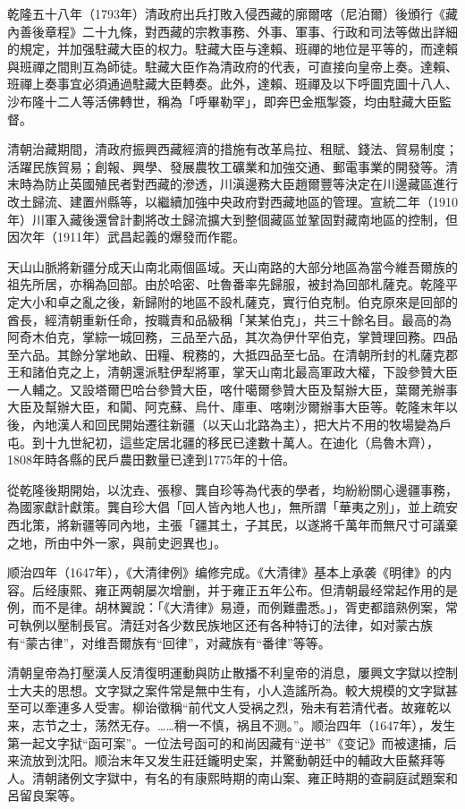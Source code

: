 乾隆五十八年（1793年）清政府出兵打敗入侵西藏的廓爾喀（尼泊爾）後頒行《藏內善後章程》二十九條，對西藏的宗教事務、外事、軍事、行政和司法等做出詳細的規定，并加强駐藏大臣的权力。駐藏大臣与達賴、班禪的地位是平等的，而達賴與班禪之間則互為師徒。駐藏大臣作為清政府的代表，可直接向皇帝上奏。達賴、班禪上奏事宜必須通過駐藏大臣轉奏。此外，達賴、班禪及以下呼圖克圖十八人、沙布隆十二人等活佛轉世，稱為「呼畢勒罕」，即奔巴金瓶掣簽，均由駐藏大臣監督。

清朝治藏期間，清政府振興西藏經濟的措施有改革烏拉、租賦、錢法、貿易制度；活躍民族貿易；創報、興學、發展農牧工礦業和加強交通、郵電事業的開發等。清末時為防止英國殖民者對西藏的滲透，川滇邊務大臣趙爾豐等決定在川邊藏區進行改土歸流、建置州縣等，以繼續加強中央政府對西藏地區的管理。宣統二年（1910年）川軍入藏後還曾計劃將改土歸流擴大到整個藏區並鞏固對藏南地區的控制，但因次年（1911年）武昌起義的爆發而作罷。

天山山脈將新疆分成天山南北兩個區域。天山南路的大部分地區為當今維吾爾族的祖先所居，亦稱為回部。由於哈密、吐魯番率先歸服，被封為回部札薩克。乾隆平定大小和卓之亂之後，新歸附的地區不設札薩克，實行伯克制。伯克原來是回部的酋長，經清朝重新任命，按職責和品級稱「某某伯克」，共三十餘名目。最高的為阿奇木伯克，掌綜一城回務，三品至六品，其次為伊什罕伯克，掌贊理回務。四品至六品。其餘分掌地畝、田糧、稅務的，大抵四品至七品。在清朝所封的札薩克郡王和諸伯克之上，清朝還派駐伊犁將軍，掌天山南北最高軍政大權，下設參贊大臣一人輔之。又設塔爾巴哈台參贊大臣，喀什噶爾參贊大臣及幫辦大臣，葉爾羌辦事大臣及幫辦大臣，和闐、阿克蘇、烏什、庫車、喀喇沙爾辦事大臣等。乾隆末年以後，內地漢人和回民開始遷往新疆（以天山北路為主），把大片不用的牧場變為戶屯。到十九世紀初，這些定居北疆的移民已達數十萬人。在迪化（烏魯木齊），1808年時各縣的民戶農田數量已達到1775年的十倍。

從乾隆後期開始，以沈垚、張穆、龔自珍等為代表的學者，均紛紛關心邊疆事務，為國家獻計獻策。龔自珍大倡「回人皆內地人也」，無所謂「華夷之別」，並上疏安西北策，將新疆等同內地，主張「疆其土，子其民，以遂將千萬年而無尺寸可議棄之地，所由中外一家，與前史迥異也」。

顺治四年（1647年），《大清律例》编修完成。《大清律》基本上承袭《明律》的内容。后经康熙、雍正两朝屡次增删，并于雍正五年公布。但清朝最经常起作用的是例，而不是律。胡林翼說：「《大清律》易遵，而例難盡悉。」，胥吏都諳熟例案，常可執例以壓制長官。清廷对各少数民族地区还有各种特订的法律，如对蒙古族有“蒙古律”，对维吾爾族有“回律”，对藏族有“番律”等等。

清朝皇帝為打壓漢人反清復明運動與防止散播不利皇帝的消息，屢興文字獄以控制士大夫的思想。文字獄之案件常是無中生有，小人造謠所為。較大規模的文字獄甚至可以牽連多人受害。柳诒徵稱“前代文人受祸之烈，殆未有若清代者。故雍乾以来，志节之士，荡然无存。……稍一不慎，祸且不测。”。顺治四年（1647年），发生第一起文字狱“函可案”。一位法号函可的和尚因藏有“逆书”《变记》而被逮捕，后来流放到沈阳。顺治末年又发生莊廷鑨明史案，并驚動朝廷中的輔政大臣鰲拜等人。清朝諸例文字獄中，有名的有康熙時期的南山案、雍正時期的查嗣庭試題案和呂留良案等。

